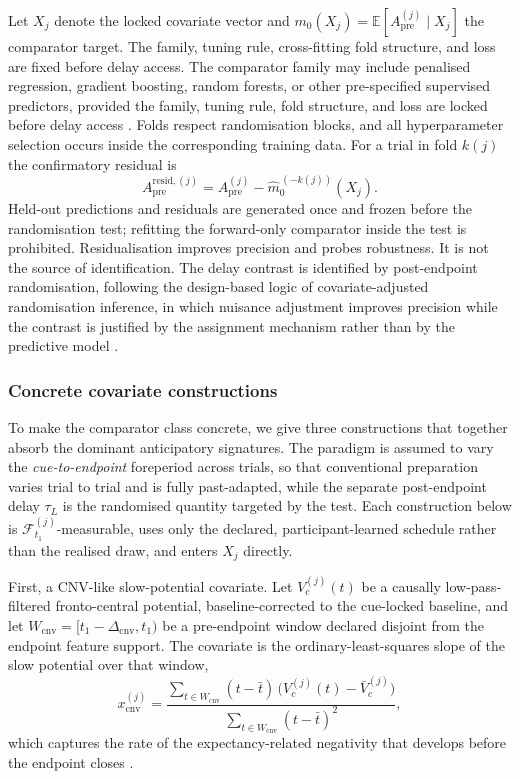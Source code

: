 \documentclass[11pt,a4paper]{article}
\theoremstyle{definition}
\newcommand{\F}{\mathcal{F}}
\newcommand{\Apre}{A_{\mathrm{pre}}}
\newcommand{\tauL}{\tau_L}
\begin{document}
Let \(X_j\) denote the locked covariate vector and
\(m_0(X_j)=\mathbb{E}[\Apre^{(j)}\mid X_j]\) the comparator target. The family,
tuning rule, cross-fitting fold structure, and loss are fixed before delay
access. The comparator family may include penalised regression, gradient
boosting, random forests, or other pre-specified supervised predictors, provided
the family, tuning rule, fold structure, and loss are locked before delay access
\citep{Bishop2006,Hastie2009}. Folds respect randomisation blocks, and all
hyperparameter selection occurs inside the corresponding training data. For a
trial in fold \(k(j)\) the confirmatory residual is
\begin{equation}
\label{eq:residual}
\Apre^{\mathrm{resid},(j)}
=\Apre^{(j)}-\widehat{m}_0^{\,(-k(j))}(X_j).
\end{equation}
Held-out predictions and residuals are generated once and frozen before the
randomisation test; refitting the forward-only comparator inside the test is prohibited. Residualisation
improves precision and probes robustness. It is not the source of
identification. The delay contrast is identified by post-endpoint randomisation,
following the design-based logic of covariate-adjusted randomisation inference,
in which nuisance adjustment improves precision while the contrast is justified by
the assignment mechanism rather than by the predictive model
\citep{ZhaoDing2021,LuEtAl2025}.

\subsubsection*{Concrete covariate constructions}

To make the comparator class concrete, we give three constructions that together
absorb the dominant anticipatory signatures. The paradigm is assumed to vary the
\textit{cue-to-endpoint} foreperiod across trials, so that conventional preparation
varies trial to trial and is fully past-adapted, while the separate post-endpoint
delay \(\tauL\) is the randomised quantity targeted by the test. Each construction
below is \(\F_{t_1}^{(j)}\)-measurable, uses only the declared, participant-learned
schedule rather than the realised draw, and enters \(X_j\) directly.

First, a CNV-like slow-potential covariate. Let \(V_c^{(j)}(t)\) be a causally
low-pass-filtered fronto-central potential, baseline-corrected to the cue-locked
baseline, and let \(W_{\mathrm{cnv}}=[t_1-\Delta_{\mathrm{cnv}},t_1)\) be a
pre-endpoint window declared disjoint from the endpoint feature support. The
covariate is the ordinary-least-squares slope of the slow potential over that
window,
\begin{equation}
\label{eq:cnv-cov}
x_{\mathrm{cnv}}^{(j)}
=\frac{\sum_{t\in W_{\mathrm{cnv}}}(t-\bar t)\,
        \bigl(V_c^{(j)}(t)-\bar V_c^{(j)}\bigr)}
       {\sum_{t\in W_{\mathrm{cnv}}}(t-\bar t)^2},
\end{equation}
which captures the rate of the expectancy-related negativity that develops before
the endpoint closes \citep{Walter1964,Trillenberg2000}.
\end{document}

